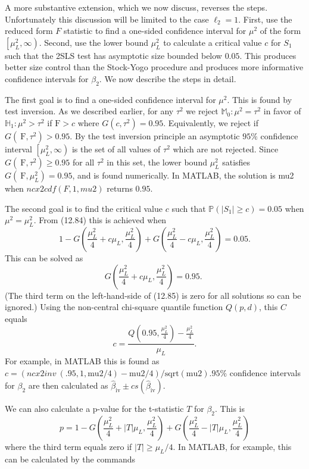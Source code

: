 \documentclass[10pt]{article}
\begin{document}
A more substantive extension, which we now discuss, reverses the steps. Unfortunately this discussion will be limited to the case $\ell_{2}=1$. First, use the reduced form $F$ statistic to find a one-sided confidence interval for $\mu^{2}$ of the form $\left[\mu_{L}^{2}, \infty\right)$. Second, use the lower bound $\mu_{L}^{2}$ to calculate a critical value $c$ for $S_{1}$ such that the 2SLS test has asymptotic size bounded below $0.05$. This produces better size control than the Stock-Yogo procedure and produces more informative confidence intervals for $\beta_{2}$. We now describe the steps in detail.

The first goal is to find a one-sided confidence interval for $\mu^{2}$. This is found by test inversion. As we described earlier, for any $\tau^{2}$ we reject $\mathbb{M}_{0}: \mu^{2}=\tau^{2}$ in favor of $\mathbb{H}_{1}: \mu^{2}>\tau^{2}$ if $\mathrm{F}>c$ where $G\left(c, \tau^{2}\right)=0.95$. Equivalently, we reject if $G\left(\mathrm{~F}, \tau^{2}\right)>0.95$. By the test inversion principle an asymptotic $95 \%$ confidence interval $\left[\mu_{L}^{2}, \infty\right)$ is the set of all values of $\tau^{2}$ which are not rejected. Since $G\left(\mathrm{~F}, \tau^{2}\right) \geq 0.95$ for all $\tau^{2}$ in this set, the lower bound $\mu_{L}^{2}$ satisfies $G\left(\mathrm{~F}, \mu_{L}^{2}\right)=0.95$, and is found numerically. In MATLAB, the solution is mu2 when $n c x 2 c d f(F, 1, m u 2)$ returns $0.95 .$

The second goal is to find the critical value $c$ such that $\mathbb{P}\left(\left|S_{1}\right| \geq c\right)=0.05$ when $\mu^{2}=\mu_{L}^{2}$. From (12.84) this is achieved when
$$
1-G\left(\frac{\mu_{L}^{2}}{4}+c \mu_{L}, \frac{\mu_{L}^{2}}{4}\right)+G\left(\frac{\mu_{L}^{2}}{4}-c \mu_{L}, \frac{\mu_{L}^{2}}{4}\right)=0.05 .
$$
This can be solved as
$$
G\left(\frac{\mu_{L}^{2}}{4}+c \mu_{L}, \frac{\mu_{L}^{2}}{4}\right)=0.95 \text {. }
$$
(The third term on the left-hand-side of (12.85) is zero for all solutions so can be ignored.) Using the non-central chi-square quantile function $Q(p, d)$, this $C$ equals
$$
c=\frac{Q\left(0.95, \frac{\mu_{L}^{2}}{4}\right)-\frac{\mu_{L}^{2}}{4}}{\mu_{L}} .
$$
For example, in MATLAB this is found as $c=(n c x 2 i n v ~(.95,1, \mathrm{mu} 2 / 4)-\mathrm{mu} 2 / 4) / \mathrm{sqrt}(\mathrm{mu} 2) .95 \%$ confidence intervals for $\beta_{2}$ are then calculated as $\widehat{\beta}_{\mathrm{iv}} \pm c s\left(\widehat{\beta}_{\mathrm{iv}}\right)$.

We can also calculate a p-value for the t-statistic $T$ for $\beta_{2}$. This is
$$
p=1-G\left(\frac{\mu_{L}^{2}}{4}+|T| \mu_{L}, \frac{\mu_{L}^{2}}{4}\right)+G\left(\frac{\mu_{L}^{2}}{4}-|T| \mu_{L}, \frac{\mu_{L}^{2}}{4}\right)
$$
where the third term equals zero if $|T| \geq \mu_{L} / 4$. In MATLAB, for example, this can be calculated by the commands
\end{document}

